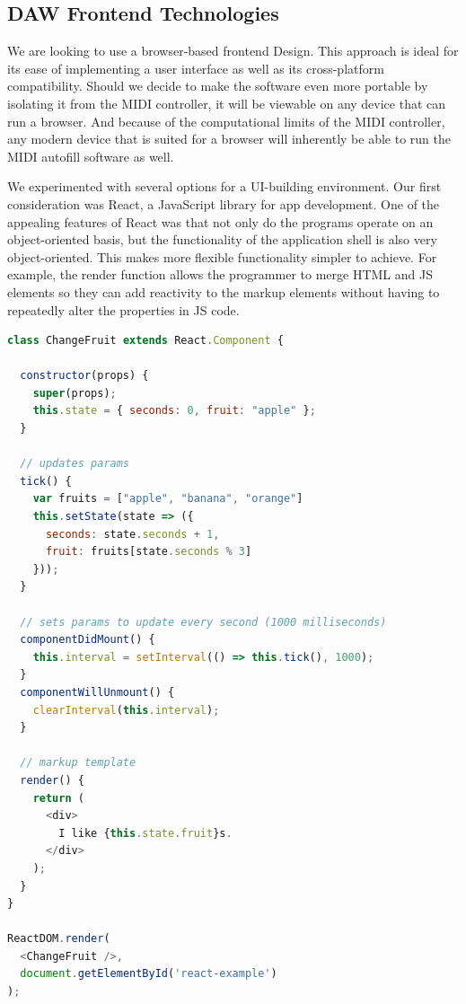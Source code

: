 \subsection{DAW Frontend Technologies}

We are looking to use a browser-based frontend Design. This approach is ideal for its ease
of implementing a user interface as well as its cross-platform compatibility. Should we
decide to make the software even more portable by isolating it from the MIDI controller,
it will be viewable on any device that can run a browser. And because of the computational
limits of the MIDI controller, any modern device that is suited for a browser will
inherently be able to run the MIDI autofill software as well.

We experimented with several options for a UI-building environment. Our first consideration was
React, a JavaScript library for app development. One of the appealing features of React was that
not only do the programs operate on an object-oriented basis, but the functionality of the
application shell is also very object-oriented. This makes more flexible functionality simpler to
achieve. For example, the render function allows the programmer to merge HTML and JS elements so
they can add reactivity to the markup elements without having to repeatedly alter the properties
in JS code.

\begin{lstlisting}[language=JavaScript, caption={A simple program made to test React during the
selection process; it focuses on demonstrating how React automatically updates the HTML layer.},
label=lis:react]
class ChangeFruit extends React.Component {

  constructor(props) {
    super(props);
    this.state = { seconds: 0, fruit: "apple" };
  }

  // updates params
  tick() {
    var fruits = ["apple", "banana", "orange"]
    this.setState(state => ({
      seconds: state.seconds + 1,
      fruit: fruits[state.seconds % 3]
    }));
  }

  // sets params to update every second (1000 milliseconds)
  componentDidMount() {
    this.interval = setInterval(() => this.tick(), 1000);
  }
  componentWillUnmount() {
    clearInterval(this.interval);
  }

  // markup template
  render() {
    return (
      <div>
        I like {this.state.fruit}s.
      </div>
    );
  }
}

ReactDOM.render(
  <ChangeFruit />,
  document.getElementById('react-example')
);
\end{lstlisting}

